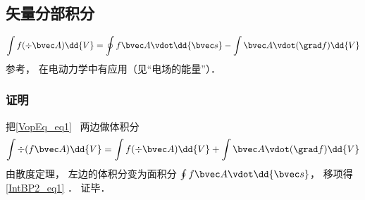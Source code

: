 \subsection{矢量分部积分}
\begin{equation}\label{IntBP2_eq1}
\int f (\div \bvec A)\dd{V} =  \oint f \bvec A \vdot \dd{\bvec s} - \int\bvec A \vdot (\grad f)\dd{V}
\end{equation}
参考\cite{GriffE}， 在电动力学中有应用（见“电场的能量”）．

\subsubsection{证明}
把\autoref{VopEq_eq1}~ 两边做体积分
\begin{equation}
\int\div (f \bvec A) \dd{V} = \int f (\div \bvec A)\dd{V} + \int\bvec A \vdot (\grad f)\dd{V}
\end{equation}
由散度定理， 左边的体积分变为面积分 $\oint f \bvec A \vdot \dd{\bvec s}$， 移项得\autoref{IntBP2_eq1} ． 证毕．
